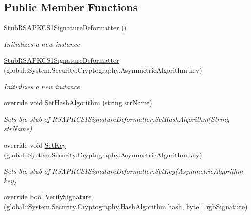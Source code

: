 \subsection*{Public Member Functions}
\begin{DoxyCompactItemize}
\item 
\hyperlink{class_system_1_1_security_1_1_cryptography_1_1_fakes_1_1_stub_r_s_a_p_k_c_s1_signature_deformatter_a8ab1f1854a31ab71c00ac853dfcb6926}{Stub\-R\-S\-A\-P\-K\-C\-S1\-Signature\-Deformatter} ()
\begin{DoxyCompactList}\small\item\em Initializes a new instance\end{DoxyCompactList}\item 
\hyperlink{class_system_1_1_security_1_1_cryptography_1_1_fakes_1_1_stub_r_s_a_p_k_c_s1_signature_deformatter_a8bf7095ca70de849dc8f0138f446dffa}{Stub\-R\-S\-A\-P\-K\-C\-S1\-Signature\-Deformatter} (global\-::\-System.\-Security.\-Cryptography.\-Asymmetric\-Algorithm key)
\begin{DoxyCompactList}\small\item\em Initializes a new instance\end{DoxyCompactList}\item 
override void \hyperlink{class_system_1_1_security_1_1_cryptography_1_1_fakes_1_1_stub_r_s_a_p_k_c_s1_signature_deformatter_a8a2ca71dced4acb356215cc62e158638}{Set\-Hash\-Algorithm} (string str\-Name)
\begin{DoxyCompactList}\small\item\em Sets the stub of R\-S\-A\-P\-K\-C\-S1\-Signature\-Deformatter.\-Set\-Hash\-Algorithm(\-String str\-Name)\end{DoxyCompactList}\item 
override void \hyperlink{class_system_1_1_security_1_1_cryptography_1_1_fakes_1_1_stub_r_s_a_p_k_c_s1_signature_deformatter_a9e9cd1e1914bb824692f85fe8e12ff17}{Set\-Key} (global\-::\-System.\-Security.\-Cryptography.\-Asymmetric\-Algorithm key)
\begin{DoxyCompactList}\small\item\em Sets the stub of R\-S\-A\-P\-K\-C\-S1\-Signature\-Deformatter.\-Set\-Key(\-Asymmetric\-Algorithm key)\end{DoxyCompactList}\item 
override bool \hyperlink{class_system_1_1_security_1_1_cryptography_1_1_fakes_1_1_stub_r_s_a_p_k_c_s1_signature_deformatter_ab20cd97d7c2b8fb7a828c160a92d066b}{Verify\-Signature} (global\-::\-System.\-Security.\-Cryptography.\-Hash\-Algorithm hash, byte\mbox{[}$\,$\mbox{]} rgb\-Signature)

\end{DoxyCompactItemize}
